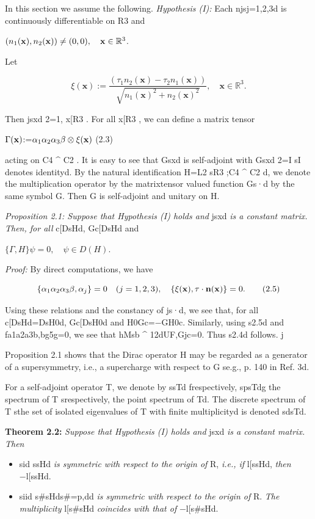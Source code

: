 \documentclass{article}
\begin{document}
In this section we assume the following. \textit{Hypothesis (I):} Each njsj=1,2,3d is continuously differentiable on R3 and

$(n_{1}({\bf x}),n_{2}({\bf x}))\neq(0,0),\quad{\bf x}\in\mathbb{R}^{3}$.

Let

$$\xi(\mathbf{x}):=\frac{(\tau_{1}n_{2}(\mathbf{x})-\tau_{2}n_{1}(\mathbf{x}))}{\sqrt{n_{1}(\mathbf{x})^{2}+n_{2}(\mathbf{x})^{2}}},\quad\mathbf{x}\in\mathbb{R}^{3}.\tag{2.2}$$

Then jsxd 2=1, x[R3 . For all x[R3 , we can define a matrix tensor

$\Gamma({\bf x})$:=$\alpha_{1}\alpha_{2}\alpha_{3}\beta\otimes\xi({\bf x})$ (2.3)

acting on C4 ^ C2 . It is easy to see that Gsxd is self-adjoint with Gsxd 2=I sI denotes identityd. By the natural identification H=L2 sR3 ;C4 ^ C2 d, we denote the multiplication operator by the matrixtensor valued function Gs·d by the same symbol G. Then G is self-adjoint and unitary on H.

\textit{Proposition 2.1: Suppose that Hypothesis (I) holds and} jsxd \textit{is a constant matrix. Then, for all} c[DsHd, Gc[DsHd and

$\{\Gamma,H\}\psi=0,\quad\psi\in D(H)$.

\textit{Proof:} By direct computations, we have

$$\{\alpha_{1}\alpha_{2}\alpha_{3}\beta,\alpha_{j}\}=0\quad(j=1,2,3),\quad\{\xi({\bf x}),\tau\cdot{\bf n}({\bf x})\}=0.\tag{2.5}$$

Using these relations and the constancy of js·d, we see that, for all c[DsHd=DsH0d, Gc[DsH0d and H0Gc=−GH0c. Similarly, using s2.5d and fa1a2a3b,bg5g=0, we see that hMsb ^ 12dUF,Gjc=0. Thus s2.4d follows. j

Proposition 2.1 shows that the Dirac operator H may be regarded as a generator of a supersymmetry, i.e., a supercharge with respect to G se.g., p. 140 in Ref. 3d.

For a self-adjoint operator T, we denote by ssTd frespectively, spsTdg the spectrum of T srespectively, the point spectrum of Td. The discrete spectrum of T sthe set of isolated eigenvalues of T with finite multiplicityd is denoted sdsTd.

\textbf{Theorem 2.2:} \textit{Suppose that Hypothesis (I) holds and} jsxd \textit{is a constant matrix. Then}
\begin{itemize}
\item 
sid ssHd \textit{is symmetric with respect to the origin of} R, \textit{i.e., if} l[ssHd, \textit{then} −l[ssHd.

\item 
siid s\#sHds\#=p,dd \textit{is symmetric with respect to the origin of} R. \textit{The multiplicity} l[s\#sHd \textit{coincides with that of} −l[s\#sHd.

\end{itemize}
\end{document}
